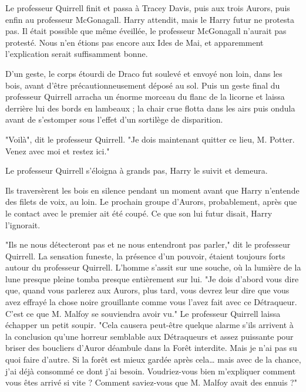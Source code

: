 Le professeur Quirrell finit et passa à Tracey Davis, puis aux trois Aurors, puis enfin au professeur McGonagall. Harry attendit, mais le Harry futur ne protesta pas. Il était possible que même éveillée, le professeur McGonagall n'aurait pas protesté. Nous n'en étions pas encore aux Ides de Mai, et apparemment l'explication serait suffisamment bonne.

D'un geste, le corps étourdi de Draco fut soulevé et envoyé non loin, dans les bois, avant d'être précautionneusement déposé au sol. Puis un geste final du professeur Quirrell arracha un énorme morceau du flanc de la licorne et laissa derrière lui des bords en lambeaux ; la chair crue flotta dans les airs puis ondula avant de s'estomper sous l'effet d'un sortilège de disparition.

"Voilà", dit le professeur Quirrell. "Je dois maintenant quitter ce lieu, M. Potter. Venez avec moi et restez ici."

Le professeur Quirrell s'éloigna à grands pas, Harry le suivit et demeura.

Ils traversèrent les bois en silence pendant un moment avant que Harry n'entende des filets de voix, au loin. Le prochain groupe d'Aurors, probablement, après que le contact avec le premier ait été coupé. Ce que son lui futur disait, Harry l'ignorait.

"Ils ne nous détecteront pas et ne nous entendront pas parler," dit le professeur Quirrell. La sensation funeste, la présence d'un pouvoir, étaient toujours forts autour du professeur Quirrell. L'homme s'assit sur une souche, où la lumière de la lune presque pleine tomba presque entièrement sur lui. "Je dois d'abord vous dire que, quand vous parlerez aux Aurors, plus tard, vous devrez leur dire que vous avez effrayé la chose noire grouillante comme vous l'avez fait avec ce Détraqueur. C'est ce que M. Malfoy se souviendra avoir vu." Le professeur Quirrell laissa échapper un petit soupir. "Cela causera peut-être quelque alarme s'ils arrivent à la conclusion qu'une horreur semblable aux Détraqueurs et assez puissante pour briser des boucliers d'Auror déambule dans la Forêt interdite. Mais je n'ai pas su quoi faire d'autre. Si la forêt est mieux gardée après cela… mais avec de la chance, j'ai déjà consommé ce dont j'ai besoin. Voudriez-vous bien m'expliquer comment vous êtes arrivé si vite ? Comment saviez-vous que M. Malfoy avait des ennuis ?"

